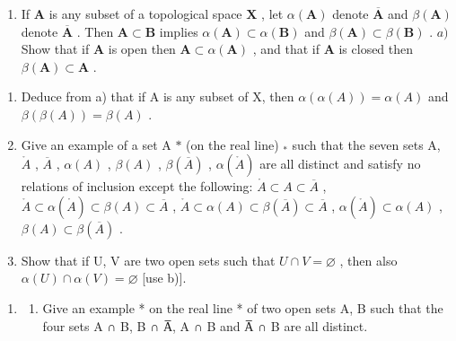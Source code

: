 \begin{enumerate}
\def\labelenumi{\arabic{enumi})}
\setcounter{enumi}{2}
\tightlist
\item
  If \(\mathbf{A}\) is any subset of a topological space \(\mathbf{X}\) , let \(\alpha(\mathbf{A})\) denote \(\overline{\mathbf{A}}\) and \(\beta(\mathbf{A})\) denote \(\overline{\mathbf{A}}\) . Then \(\mathbf{A} \subset \mathbf{B}\) implies \(\alpha(\mathbf{A}) \subset \alpha(\mathbf{B})\) and \(\beta(\mathbf{A}) \subset \beta(\mathbf{B})\) . \(a)\) Show that if \(\mathbf{A}\) is open then \(\mathbf{A} \subset \alpha(\mathbf{A})\) , and that if \(\mathbf{A}\) is closed then \(\beta(\mathbf{A}) \subset \mathbf{A}\) .
\end{enumerate}

\begin{enumerate}
\def\labelenumi{\alph{enumi})}
\setcounter{enumi}{1}
\item
  Deduce from a) that if A is any subset of X, then \(\alpha(\alpha(A)) = \alpha(A)\) and \(\beta(\beta(A)) = \beta(A)\) .
\item
  Give an example of a set A \(*\) (on the real line) \(_{*}\) such that the seven sets A, \(\mathring{A}\) , \(\overline{A}\) , \(\alpha(A)\) , \(\beta(A)\) , \(\beta(\overline{A})\) , \(\alpha(\mathring{A})\) are all distinct and satisfy no relations of inclusion except the following: \(\mathring{A} \subset A \subset \overline{A}\) , \(\mathring{A} \subset \alpha(\mathring{A}) \subset \beta(A) \subset \overline{A}\) , \(\mathring{A} \subset \alpha(A) \subset \beta(\overline{A}) \subset \overline{A}\) , \(\alpha(\mathring{A}) \subset \alpha(A)\) , \(\beta(A) \subset \beta(\overline{A})\) .
\item
  Show that if U, V are two open sets such that \(U \cap V = \varnothing\) , then also \(\alpha(U) \cap \alpha(V) = \varnothing\) {[}use b){]}.
\end{enumerate}

\begin{enumerate}
\def\labelenumi{\arabic{enumi})}
\setcounter{enumi}{3}
\tightlist
\item
  \begin{enumerate}
  \def\labelenumii{\alph{enumii})}
  \tightlist
  \item
    Give an example * on the real line * of two open sets A, B such that the four sets A ∩ B, B ∩ A̅, A ∩ B and A̅ ∩ B are all distinct.
  \end{enumerate}
\end{enumerate}

